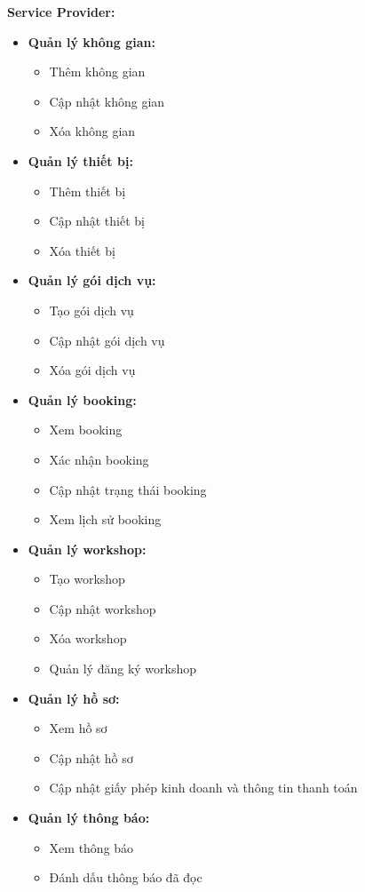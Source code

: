 \textbf{Service Provider:}

\begin{itemize}
	\item \textbf{Quản lý không gian:}
	\begin{itemize}
		\item Thêm không gian
		\item Cập nhật không gian
		\item Xóa không gian
	\end{itemize}
	
	\item \textbf{Quản lý thiết bị:}
	\begin{itemize}
		\item Thêm thiết bị
		\item Cập nhật thiết bị
		\item Xóa thiết bị
	\end{itemize}
	
	\item \textbf{Quản lý gói dịch vụ:}
	\begin{itemize}
		\item Tạo gói dịch vụ
		\item Cập nhật gói dịch vụ
		\item Xóa gói dịch vụ
	\end{itemize}
	
	\item \textbf{Quản lý booking:}
	\begin{itemize}
		\item Xem booking
		\item Xác nhận booking
		\item Cập nhật trạng thái booking
		\item Xem lịch sử booking
	\end{itemize}
	
	\item \textbf{Quản lý workshop:}
	\begin{itemize}
		\item Tạo workshop
		\item Cập nhật workshop
		\item Xóa workshop
		\item Quản lý đăng ký workshop
	\end{itemize}
	
	\item \textbf{Quản lý hồ sơ:}
	\begin{itemize}
		\item Xem hồ sơ
		\item Cập nhật hồ sơ
		\item Cập nhật giấy phép kinh doanh và thông tin thanh toán
	\end{itemize}
	
	\item \textbf{Quản lý thông báo:}
	\begin{itemize}
		\item Xem thông báo
		\item Đánh dấu thông báo đã đọc
	\end{itemize}
	
\end{itemize}

